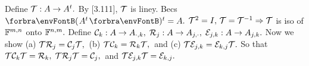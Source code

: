 \BulletPointX{}\;\;Define $\mathcal{T}:A\rightarrow A^t.$ By [3.111], $\mathcal{T}$ is liney. Becs $\Par{A^t}{^t}=A.$ \TextB{}
$\mathcal{T}^2=I,\,\mathcal{T}=\mathcal{T}^{-1}\Rightarrow \mathcal{T}$ is iso of ${\mathbb{F}}^{m,n}$ onto ${\mathbb{F}}^{n,m}.$ \;Define $\mathcal{C}_k:A\rightarrow A_{\cdot,k},\;\mathcal{R}_j:A\rightarrow A_{j,\cdot},\;\mathcal{E}_{j,k}:A\rightarrow A_{j,k}.$\TextB{}
Now we show (a) \uline{$\mathcal{T}\mathcal{R}_j=\mathcal{C}_j\mathcal{T},$} \,(b) \uline{$\mathcal{T}\mathcal{C}_k=\mathcal{R}_k\mathcal{T},$} \,and (c) \uline{$\mathcal{T}\mathcal{E}_{j,k}=\mathcal{E}_{k,j}\mathcal{T}.$}\TextB{\vspace{2pt}}
So that $\mathcal{T}\mathcal{C}_k\mathcal{T}=\mathcal{R}_k,\;\mathcal{T}\mathcal{R}_j\mathcal{T}=\mathcal{C}_j,$ \,and $\mathcal{T}\mathcal{E}_{j,k}\mathcal{T}=\mathcal{E}_{k,j}.$\TextB{\vspace{4pt}}
